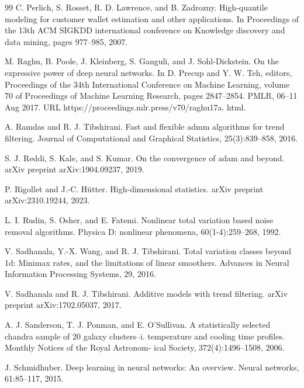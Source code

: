 \documentclass[twoside,11pt]{article}
\begin{document}
\begin{thebibliography}{99}
 C. Perlich, S. Rosset, R. D. Lawrence, and B. Zadrozny. High-quantile modeling for customer wallet estimation and other applications. In Proceedings of the 13th ACM SIGKDD international conference on Knowledge discovery and data mining, pages 977--985, 2007.

 M. Raghu, B. Poole, J. Kleinberg, S. Ganguli, and J. Sohl-Dickstein. On the expressive power of deep neural networks. In D. Precup and Y. W. Teh, editors, Proceedings of the 34th International Conference on Machine Learning, volume 70 of Proceedings of Machine Learning Research, pages 2847--2854. PMLR, 06--11 Aug 2017. URL https://proceedings.mlr.press/v70/raghu17a. html.

 A. Ramdas and R. J. Tibshirani. Fast and flexible admm algorithms for trend filtering. Journal of Computational and Graphical Statistics, 25(3):839--858, 2016.

 S. J. Reddi, S. Kale, and S. Kumar. On the convergence of adam and beyond. arXiv preprint arXiv:1904.09237, 2019.

 P. Rigollet and J.-C. Hütter. High-dimensional statistics. arXiv preprint arXiv:2310.19244, 2023.

 L. I. Rudin, S. Osher, and E. Fatemi. Nonlinear total variation based noise removal algorithms. Physica D: nonlinear phenomena, 60(1-4):259--268, 1992.

 V. Sadhanala, Y.-X. Wang, and R. J. Tibshirani. Total variation classes beyond 1d: Minimax rates, and the limitations of linear smoothers. Advances in Neural Information Processing Systems, 29, 2016.

 V. Sadhanala and R. J. Tibshirani. Additive models with trend filtering. arXiv preprint arXiv:1702.05037, 2017.

 A. J. Sanderson, T. J. Ponman, and E. O'Sullivan. A statistically selected chandra sample of 20 galaxy clusters--i. temperature and cooling time profiles. Monthly Notices of the Royal Astronom- ical Society, 372(4):1496--1508, 2006.

 J. Schmidhuber. Deep learning in neural networks: An overview. Neural networks, 61:85--117, 2015.


\end{thebibliography}
\end{document}
